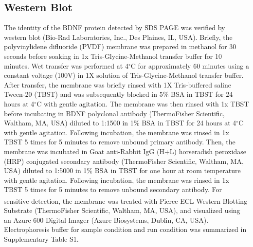 \documentclass[review]{elsarticle}
\begin{document}
\subsection{Western Blot} 
The identity of the BDNF protein detected by SDS PAGE was verified by western blot (Bio-Rad Laboratories, Inc., Des Plaines, IL, USA). Briefly, the polyvinylidene difluoride (PVDF) membrane was prepared in methanol for 30 seconds before soaking in 1x Tris-Glycine-Methanol transfer buffer for 10 minutes. Wet transfer was performed at 4$^\circ$C for approximately 60 minutes using a constant voltage (100V) in 1X solution of Tris-Glycine-Methanol transfer buffer. After transfer, the membrane was briefly rinsed with 1X Tris-buffered saline Tween-20 (TBST) and was subsequently blocked in 5\% BSA in TBST for 24 hours at 4$^\circ$C with gentle agitation. The membrane was then rinsed with 1x TBST before incubating in BDNF polyclonal antibody (ThermoFisher Scientific, Waltham, MA, USA) diluted to 1:1500 in 1\% BSA in TBST for 24 hours at 4$^\circ$C with gentle agitation. Following incubation, the membrane was rinsed in 1x TBST 5 times for 5 minutes to remove unbound primary antibody. Then, the membrane was incubated in Goat anti-Rabbit IgG (H+L) horseradish peroxidase (HRP) conjugated secondary antibody (ThermoFisher Scientific, Waltham, MA, USA) diluted to 1:5000 in 1\% BSA in TBST for one hour at room temperature with gentle agitation. Following incubation, the membrane was rinsed in 1x TBST 5 times for 5 minutes to remove unbound secondary antibody. For sensitive detection, the membrane was treated with Pierce\textsuperscript{\texttrademark} ECL Western Blotting Substrate (ThermoFisher Scientific, Waltham, MA, USA), and visualized using an Azure 600 Digital Imager (Azure Biosystems, Dublin, CA, USA). Electrophoresis buffer for sample condition and run condition was summarized in Supplementary Table S1. 
\end{document}

